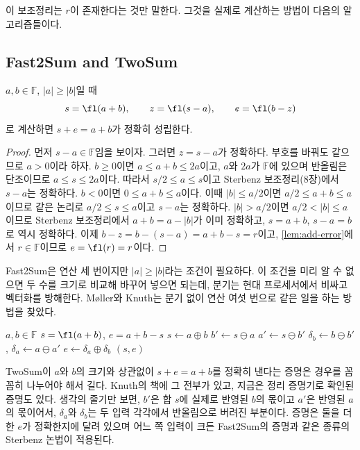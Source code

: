 이 보조정리는 $r$이 존재한다는 것만 말한다. 그것을 실제로 계산하는 방법이 다음의 알고리즘들이다.

\subsection{Fast2Sum and TwoSum}

\begin{theorem}
\label{thm:fast2sum}
$a,b\in\mathbb F$, $|a|\ge|b|$일 때
\[
s=\fl(a+b),\qquad z=\fl(s-a),\qquad e=\fl(b-z)
\]
로 계산하면 $s+e=a+b$가 정확히 성립한다.
\end{theorem}

\begin{proof}
먼저 $s-a\in\mathbb F$임을 보이자. 그러면 $z=s-a$가 정확하다. 부호를 바꿔도 같으므로 $a>0$이라 하자. $b\ge0$이면 $a\le a+b\le2a$이고, $a$와 $2a$가 $\mathbb F$에 있으며 반올림은 단조이므로 $a\le s\le2a$이다. 따라서 $s/2\le a\le s$이고 Sterbenz 보조정리(8장)에서 $s-a$는 정확하다. $b<0$이면 $0\le a+b\le a$이다. 이때 $|b|\le a/2$이면 $a/2\le a+b\le a$이므로 같은 논리로 $a/2\le s\le a$이고 $s-a$는 정확하다. $|b|>a/2$이면 $a/2<|b|\le a$이므로 Sterbenz 보조정리에서 $a+b=a-|b|$가 이미 정확하고, $s=a+b$, $s-a=b$로 역시 정확하다. 이제 $b-z=b-(s-a)=a+b-s=r$이고, \cref{lem:add-error}에서 $r\in\mathbb F$이므로 $e=\fl(r)=r$이다.
\end{proof}

Fast2Sum은 연산 세 번이지만 $|a|\ge|b|$라는 조건이 필요하다. 이 조건을 미리 알 수 없으면 두 수를 크기로 비교해 바꾸어 넣으면 되는데, 분기는 현대 프로세서에서 비싸고 벡터화를 방해한다. Møller와 Knuth는 분기 없이 연산 여섯 번으로 같은 일을 하는 방법을 찾았다\cite{moller1965,knuth1997taocp2}.

\begin{algorithm}[t]
\begin{algorithmic}[1]
\Require $a,b\in\mathbb F$
\Ensure $s=\fl(a+b)$, $e=a+b-s$
\State $s\gets a\oplus b$
\State $b'\gets s\ominus a$ 
\State $a'\gets s\ominus b'$ 
\State $\delta_b\gets b\ominus b'$, $\delta_a\gets a\ominus a'$
\State $e\gets\delta_a\oplus\delta_b$
\State \Return $(s,e)$
\end{algorithmic}
\caption{TwoSum}
\label{alg:twosum}
\end{algorithm}

TwoSum이 $a$와 $b$의 크기와 상관없이 $s+e=a+b$를 정확히 낸다는 증명은 경우를 꼼꼼히 나누어야 해서 길다. Knuth의 책에 그 전부가 있고\cite{knuth1997taocp2}, 지금은 정리 증명기로 확인된 증명도 있다. 생각의 줄기만 보면, $b'$은 합 $s$에 실제로 반영된 $b$의 몫이고 $a'$은 반영된 $a$의 몫이어서, $\delta_a$와 $\delta_b$는 두 입력 각각에서 반올림으로 버려진 부분이다. 증명은 둘을 더한 $e$가 정확한지에 달려 있으며 어느 쪽 입력이 크든 Fast2Sum의 증명과 같은 종류의 Sterbenz 논법이 적용된다.

